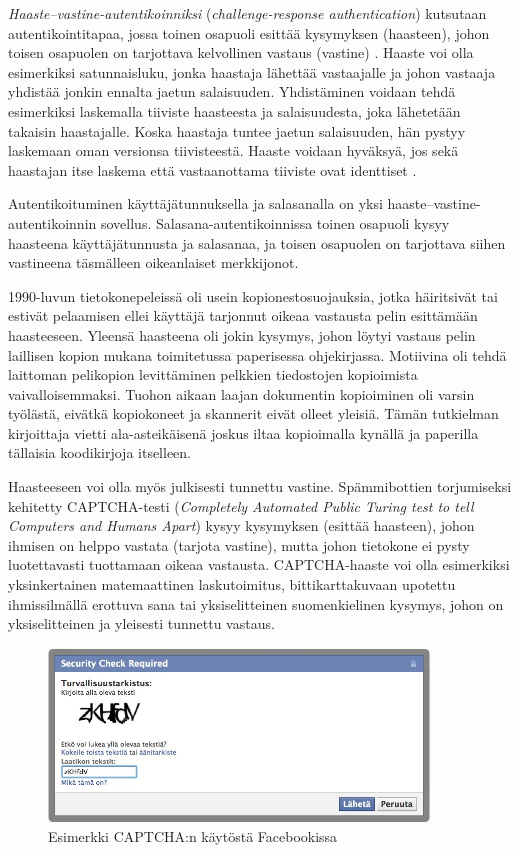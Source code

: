 \documentclass[finnish,gradu]{tktltiki}
\begin{document}
  \emph{Haaste--vastine-autentikoinniksi} (\emph{challenge-response authentication}) kutsutaan autentikointitapaa, jossa toinen osapuoli esittää kysymyksen (haasteen), johon toisen osapuolen on tarjottava kelvollinen vastaus (vastine) \cite{NIST_SP800-63-1}. Haaste voi olla esimerkiksi satunnaisluku, jonka haastaja lähettää vastaajalle ja johon vastaaja yhdistää jonkin ennalta jaetun salaisuuden. Yhdistäminen voidaan tehdä esimerkiksi laskemalla tiiviste haasteesta ja salaisuudesta, joka lähetetään takaisin haastajalle. Koska haastaja tuntee jaetun salaisuuden, hän pystyy laskemaan oman versionsa tiivisteestä. Haaste voidaan hyväksyä, jos sekä haastajan itse laskema että vastaanottama tiiviste ovat identtiset \cite{NIST_SP800-63-1}.

  Autentikoituminen käyttäjätunnuksella ja salasanalla on yksi haaste--vastine-autentikoinnin sovellus. Salasana-autentikoinnissa toinen osapuoli kysyy haasteena käyttäjätunnusta ja salasanaa, ja toisen osapuolen on tarjottava siihen vastineena täsmälleen oikeanlaiset merkkijonot.

  1990-luvun tietokonepeleissä oli usein kopionestosuojauksia, jotka häiritsivät tai estivät pelaamisen ellei käyttäjä tarjonnut oikeaa vastausta pelin esittämään haasteeseen. Yleensä haasteena oli jokin kysymys, johon löytyi vastaus pelin laillisen kopion mukana toimitetussa paperisessa ohjekirjassa. Motiivina oli tehdä laittoman pelikopion levittäminen pelkkien tiedostojen kopioimista vaivalloisemmaksi. Tuohon aikaan laajan dokumentin kopioiminen oli varsin työlästä, eivätkä kopiokoneet ja skannerit eivät olleet yleisiä. Tämän tutkielman kirjoittaja vietti ala-asteikäisenä joskus iltaa kopioimalla kynällä ja paperilla tällaisia koodikirjoja itselleen.

  Haasteeseen voi olla myös julkisesti tunnettu vastine. Spämmibottien torjumiseksi kehitetty CAPTCHA-testi (\emph{Completely Automated Public Turing test to tell Computers and Humans Apart}) kysyy kysymyksen (esittää haasteen), johon ihmisen on helppo vastata (tarjota vastine), mutta johon tietokone ei pysty luotettavasti tuottamaan oikeaa vastausta. CAPTCHA-haaste voi olla esimerkiksi yksinkertainen matemaattinen laskutoimitus, bittikarttakuvaan upotettu ihmissilmällä erottuva sana tai yksiselitteinen suomenkielinen kysymys, johon on yksiselitteinen ja yleisesti tunnettu vastaus.

  \begin{figure}
    \centering
    \includegraphics[width=0.9\textwidth]{images/Facebook_captcha_filled.jpg}
    \caption{Esimerkki CAPTCHA:n käytöstä Facebookissa}
    \label{fig:captcha_facebook}
  \end{figure}
\end{document}
